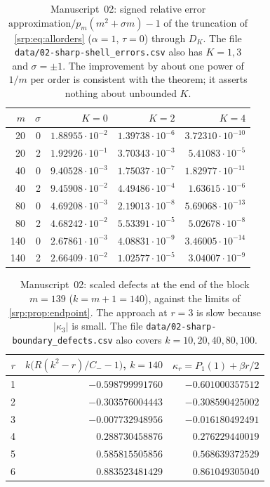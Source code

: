 \documentclass[11pt,a4paper]{article}
\numberwithin{equation}{section}
\theoremstyle{definition}
\theoremstyle{remark}
\begin{document}
\begin{table}[htbp]
\centering\small
\begin{tabular}{rr rrr}
\toprule
$m$ & $\sigma$ & $K=0$ & $K=2$ & $K=4$\\
\midrule
20 & 0 & $1.88955\cdot10^{-2}$ & $1.39738\cdot10^{-6}$ & $3.72310\cdot10^{-10}$\\
20 & 2 & $1.92926\cdot10^{-1}$ & $3.70343\cdot10^{-3}$ & $5.41083\cdot10^{-5}$\\
40 & 0 & $9.40528\cdot10^{-3}$ & $1.75037\cdot10^{-7}$ & $1.82977\cdot10^{-11}$\\
40 & 2 & $9.45908\cdot10^{-2}$ & $4.49486\cdot10^{-4}$ & $1.63615\cdot10^{-6}$\\
80 & 0 & $4.69208\cdot10^{-3}$ & $2.19013\cdot10^{-8}$ & $5.69068\cdot10^{-13}$\\
80 & 2 & $4.68242\cdot10^{-2}$ & $5.53391\cdot10^{-5}$ & $5.02678\cdot10^{-8}$\\
140 & 0 & $2.67861\cdot10^{-3}$ & $4.08831\cdot10^{-9}$ & $3.46005\cdot10^{-14}$\\
140 & 2 & $2.66409\cdot10^{-2}$ & $1.02577\cdot10^{-5}$ & $3.04007\cdot10^{-9}$\\
\bottomrule
\end{tabular}
\caption{Manuscript~02: signed relative error
$\text{approximation}/p_m(m^2+\sigma m)-1$ of the truncation of
\eqref{srp:eq:allorders} ($\alpha=1$, $\tau=0$) through $D_K$. The file
\texttt{data/02-sharp-shell\_errors.csv} also has $K=1,3$ and
$\sigma=\pm1$. The improvement by about one power of $1/m$ per order is
consistent with the theorem; it asserts nothing about unbounded $K$.}
\label{srp:se:tab:shell}
\end{table}

\begin{table}[htbp]
\centering\small
\begin{tabular}{r rr}
\toprule
$r$ & $k\bigl(R(k^2-r)/C_--1\bigr)$, $k=140$ & $\kappa_r=P_1(1)+\beta r/2$\\
\midrule
1 & $-0.598799991760$ & $-0.601000357512$\\
2 & $-0.303576004443$ & $-0.308590425002$\\
3 & $-0.007732948956$ & $-0.016180492491$\\
4 & $0.288730458876$ & $0.276229440019$\\
5 & $0.585815505856$ & $0.568639372529$\\
6 & $0.883523481429$ & $0.861049305040$\\
\bottomrule
\end{tabular}
\caption{Manuscript~02: scaled defects at the end of the block $m=139$
($k=m+1=140$), against the limits of \cref{srp:prop:endpoint}. The
approach at $r=3$ is slow because $|\kappa_3|$ is small. The file
\texttt{data/02-sharp-boundary\_defects.csv} also covers $k=10,20,40,80,100$.}
\label{srp:se:tab:boundary}
\end{table}
\end{document}
